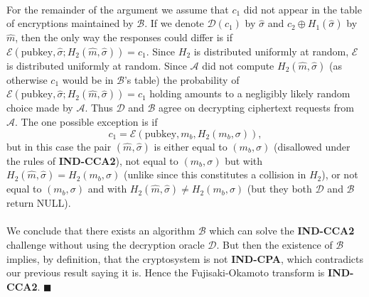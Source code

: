 \documentclass[letterpaper,12pt,oneside,onecolumn]{report}
\begin{document}
\paragraph{}
For the remainder of the argument we assume that $c_1$ did not appear in the table of encryptions maintained by $\mathcal{B}$. If we denote $\mathcal{D}(c_1)$ by $\hat{\sigma}$ and $c_2 \oplus H_1(\hat{\sigma})$ by $\hat{m}$, then the only way the responses could differ is if $\mathcal{E}(\text{pubkey}, \hat{\sigma}; H_2(\hat{m}, \hat{\sigma})) = c_1$. Since $H_2$ is distributed uniformly at random, $\mathcal{E}$ is distributed uniformly at random. Since $\mathcal{A}$ did not compute $H_2(\hat{m}, \hat{\sigma})$ (as otherwise $c_1$ would be in $\mathcal{B}$'s table) the probability of $\mathcal{E}(\text{pubkey}, \hat{\sigma}; H_2(\hat{m}, \hat{\sigma})) = c_1$ holding amounts to a negligibly likely random choice made by $\mathcal{A}$. Thus $\mathcal{D}$ and $\mathcal{B}$ agree on decrypting ciphertext requests from $\mathcal{A}$. The one possible exception is if 
$$c_1 =  \mathcal{E}(\text{pubkey}, m_b, H_2(m_b, \sigma)),$$ but in this case the pair $(\hat{m}, \hat{\sigma})$ is either equal to $(m_b, \sigma)$ (disallowed under the rules of \textbf{IND-CCA2}), not equal to $(m_b, \sigma)$ but with $H_2(\hat{m}, \hat{\sigma}) = H_2(m_b, \sigma)$ (unlike since this constitutes a collision in $H_2$), or not equal to $(m_b, \sigma)$ and with $H_2(\hat{m}, \hat{\sigma}) \neq H_2(m_b, \sigma)$ (but they both $\mathcal{D}$ and $\mathcal{B}$ return NULL).
\paragraph{}
We conclude that there exists an algorithm $\mathcal{B}$ which can solve the \textbf{IND-CCA2} challenge without using the decryption oracle $\mathcal{D}$. But then the existence of $\mathcal{B}$ implies, by definition, that the cryptosystem is not \textbf{IND-CPA}, which contradicts our previous result saying it is. Hence the Fujisaki-Okamoto transform is \textbf{IND-CCA2}. $\blacksquare$
\end{document}
